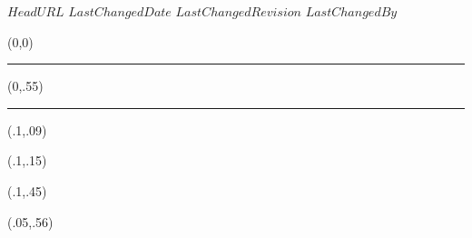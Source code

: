 \svnidlong
{$HeadURL$}
{$LastChangedDate$}
{$LastChangedRevision$}
{$LastChangedBy$}

\thispagestyle{empty}

\begin{textblock}{1}(0,0)
	\noindent\textcolor{redill}{\rule{\paperwidth}{.55\paperheight}}
\end{textblock}


\begin{textblock}{1}(0,.55)
	\noindent\textcolor{black}{\rule{\paperwidth}{.45\paperheight}}
\end{textblock}


\begin{textblock}{1}(.1,.09)
\end{textblock}

\begin{textblock}{1}(.1,.15)
\end{textblock}


\begin{textblock}{1}(.1,.45)
	\noindent {\fontsize{20.74}{2}\selectfont
		\bfseries\textcolor{white}{Elisa Antuca\\[2mm]Massimo Bertolotti}}
\end{textblock}



\begin{textblock}{.9}(.05,.56)
	\begin{flushright}
		\noindent {\fontsize{20.74}{2}\selectfont
			\bfseries\textcolor{redill}{Manualozzo di Geometria 2}}
	\end{flushright}
\end{textblock}


